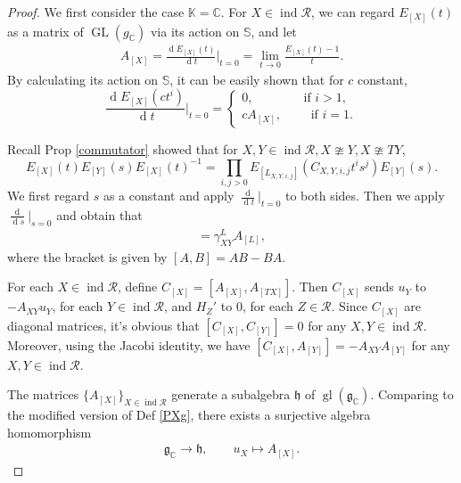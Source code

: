 \documentclass[12pt]{amsart}
\begin{document}
\begin{proof}
    We first consider the case $\mathbb{K}=\mathbb{C}$.    
    For $X\in \operatorname{ind}\mathcal{R}$, we can regard $E_{[X]}(t)$ as a matrix of $\operatorname{GL}(g_{\mathbb{C}})$ via its action on $\mathbb{S}$, and let 
    \begin{align*}
        A_{[X]}=\frac{\operatorname{d}E_{[X]}(t)}{\operatorname{d}t}\Big|_{t=0} = \operatorname{lim}\limits_{t\rightarrow 0} \frac{E_{[X]}(t)-1}{t}.
    \end{align*}
    By calculating its action on $\mathbb{S}$, it can be easily shown that for $c$ constant, 
    \begin{equation*}
        \frac{\operatorname{d}E_{[X]}(ct^i)}{\operatorname{d}t}\Big|_{t=0} = 
        \begin{cases}
            0,\qquad \qquad \text{if }i>1,\\
            cA_{[X]},\qquad \text{   if }i=1.
        \end{cases} 
    \end{equation*}

    Recall Prop \ref{commutator} showed that for $X,Y\in \operatorname{ind}\mathcal{R}, X\ncong Y, X\ncong TY$, 
     \begin{equation*}
        E_{[X]}(t) E_{[Y]}(s) E_{[X]}(t)^{-1}= \prod\limits_{i,j>0} E_{[L_{X,Y,i,j}]}(C_{X,Y,i,j}t^i s^j) E_{[Y]}(s).
    \end{equation*}
    We first regard $s$ as a constant and apply $\frac{\operatorname{d}}{\operatorname{d}t}|_{t=0}$ to both sides.
    Then we apply $\frac{\operatorname{d}}{\operatorname{d}s}|_{s=0}$ and obtain that 
    \begin{align*}
        [A_{[X]},A_{[Y]}] = \gamma_{XY}^L A_{[L]},
    \end{align*} 
    where the bracket is given by $[A,B]=AB-BA$.

    For each $X\in \operatorname{ind}\mathcal{R}$, define $C_{[X]}=[A_{[X]},A_{[TX]}]$.
    Then $C_{[X]}$ sends $u_{Y}$ to $-A_{XY}u_Y$, for each $Y\in \operatorname{ind}\mathcal{R}$, and $H_{Z}'$ to $0$, for each $Z\in \mathcal{R}$.
    Since $C_{[X]}$ are diagonal matrices, it's obvious that $[C_{[X]},C_{[Y]}]=0$ for any $X,Y\in \operatorname{ind}\mathcal{R}$.
    Moreover, using the Jacobi identity, we have $[C_{[X]},A_{[Y]}]=-A_{XY}A_{[Y]}$ for any $X,Y\in \operatorname{ind}\mathcal{R}$.

    The matrices $\{A_{[X]}\}_{X\in \operatorname{ind}\mathcal{R}}$ generate a subalgebra $\mathfrak{h}$ of $\operatorname{gl}(\mathfrak{g}_{\mathbb{C}})$. 
    Comparing to the modified version of Def \ref{PXg}, there exists a surjective algebra homomorphism 
    \begin{align*}
        \mathfrak{g}_{\mathbb{C}} \rightarrow \mathfrak{h}, \qquad u_X \mapsto A_{[X]}.
    \end{align*}
    

\end{proof}
\end{document}
